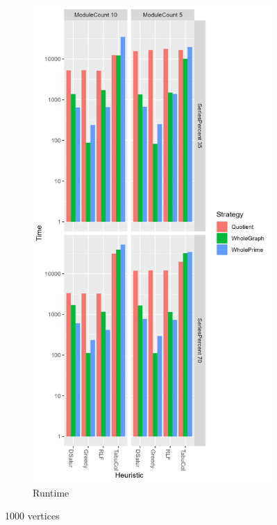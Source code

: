 \documentclass[a4paper]{article}
\begin{document}
\begin{figure}
\begin{subfigure}{.5\paperwidth}
    \end{subfigure}%
    \begin{subfigure}{.5\paperwidth}
        \includegraphics[width=\columnwidth]{Tables/1000Time.png}
      \caption{Runtime}
      \label{fig:1000t}
    \end{subfigure}
\caption{1000 vertices}
\label{fig:1000}
\end{figure}
\end{document}
